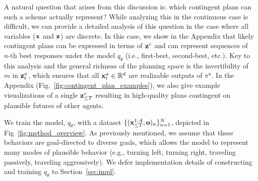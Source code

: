 \documentclass[conference]{IEEEtran}
\begin{document}
 A natural question that arises from this discussion is: which contingent plans can such a scheme actually represent? While analyzing this in the continuous case is difficult, we can provide a detailed analysis of this question in the case where all variables ($\mathbf{x}$ and $\mathbf{z}$) are discrete. In this case, we show in the Appendix that likely contingent plans can be expressed in terms of $\mathbf{z}^r$ and can represent sequences of $n$-th best responses under the model $q_\theta$ (i.e., first-best, second-best, etc.). Key to this analysis and the general richness of the planning space is the invertibility of $m$ in $\mathbf{z}_t^a$, which ensures that all $\mathbf{x}_t^a \in \mathbb R^d$ are realizable outputs of $\pi^a$. In the Appendix (Fig.~\ref{fig:contingent_plan_examples}), we also give example visualizations of a single $\mathbf{z}^r_{\leq T}$ resulting in high-quality plans contingent on plausible futures of other agents.

We train the model, $q_\theta$, with a dataset $\{(\mathbf{x}_{\leq T}^{1:A}, \mathbf{o})_n\}_{n=1}^N$, depicted in Fig~\ref{fig:method_overview}. As previously mentioned, we assume that these behaviors are goal-directed to diverse goals, which allows the model to represent many modes of plausible behavior (e.g., turning left, turning right, traveling passively, traveling aggressively). We defer implementation details of constructing and training $q_\theta$ to Section~\ref{sec:impl}. 

\vspace{-.5em}
\end{document}
